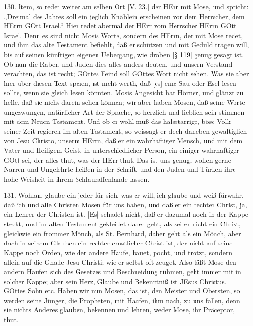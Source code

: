 130. Item, so redet weiter am selben Ort [V. 23.] der HErr mit Mose, und spricht: „Dreimal des Jahres soll ein jeglich Knäblein erscheinen vor dem Herrscher, dem HErrn GOtt Israel.“ Hier redet abermal der HErr vom Herrscher HErrn GOtt Israel. Denn es sind nicht Mosis Worte, sondern des HErrn, der mit Mose redet, und ihm das alte Testament befiehlt, daß er schützen und mit Geduld tragen will, bis auf seinen künftigen eigenen Uebergang, wie droben [§ 119] genug gesagt ist. Ob nun die Raben und Juden dies alles anders deuten, und unsern Verstand verachten, das ist recht; GOttes Feind soll GOttes Wort nicht sehen. Was sie aber hier über diesen Text speien, ist nicht werth, daß [es] eine Sau oder Esel lesen sollte, wenn sie gleich lesen könnten. Mosis Angesicht hat Hörner, und glänzt zu helle, daß sie nicht darein sehen können; wir aber haben Mosen, daß seine Worte ungezwungen, natürlicher Art der Sprache, so herzlich und lieblich sein stimmen mit dem Neuen Testament. Und ob er wohl muß das halsstarrige, böse Volk seiner Zeit regieren im alten Testament, so weissagt er doch daneben gewaltiglich von Jesu Christo, unserm HErrn, daß er ein wahrhaftiger Mensch, und mit dem Vater und Heiligem Geist, in unterschiedlicher Person, ein einiger wahrhaftiger GOtt sei, der alles thut, was der HErr thut. Das ist uns genug, wollen gerne Narren und Ungelehrte heißen in der Schrift, und den Juden und Türken ihre hohe Weisheit in ihrem Schlauraffenlande lassen.

131. Wohlan, glaube ein jeder für sich, was er will, ich glaube und weiß fürwahr, daß ich und alle Christen Mosen für uns haben, und daß er ein rechter Christ, ja, ein Lehrer der Christen ist. [Es] schadet nicht, daß er dazumal noch in der Kappe steckt, und im alten Testament gekleidet daher geht, als sei er nicht ein Christ, gleichwie ein frommer Mönch, als St. Bernhard, daher geht als ein Mönch, aber doch in seinem Glauben ein rechter ernstlicher Christ ist, der nicht auf seine Kappe noch Orden, wie der andere Haufe, bauet, pocht, und trotzt, sondern allein auf die Gnade Jesu Christi; wie er selbst oft zeuget. Also läßt Mose den andern Haufen sich des Gesetzes und Beschneidung rühmen, geht immer mit in solcher Kappe; aber sein Herz, Glaube und Bekenntniß ist JEsus Christus, GOttes Sohn etc. Haben wir nun Mosen, das ist, den Meister und Obersten, so werden seine Jünger, die Propheten, mit Haufen, ihm nach, zu uns fallen, denn sie nichts Anderes glauben, bekennen und lehren, weder Mose, ihr Präceptor, thut.

